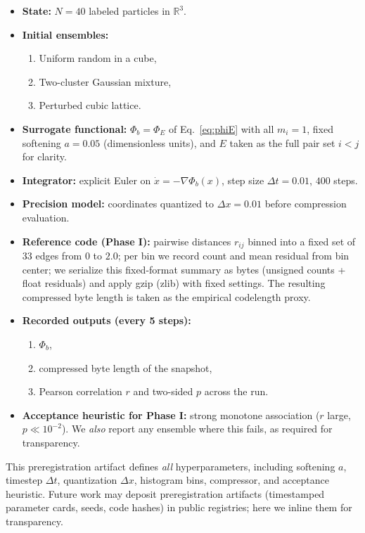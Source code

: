 \documentclass[11pt]{article}
\begin{document}
\begin{itemize}
    \item \textbf{State:} $N{=}40$ labeled particles in $\mathbb{R}^3$.
    \item \textbf{Initial ensembles:}
    \begin{enumerate}
        \item Uniform random in a cube,
        \item Two-cluster Gaussian mixture,
        \item Perturbed cubic lattice.
    \end{enumerate}
    \item \textbf{Surrogate functional:} $\Phi_b = \Phi_E$ of Eq.~\eqref{eq:phiE} with all $m_i{=}1$, fixed softening $a{=}0.05$ (dimensionless units), and $E$ taken as the full pair set $i{<}j$ for clarity.
    \item \textbf{Integrator:} explicit Euler on $\dot{x}=-\nabla\Phi_b(x)$, step size $\Delta t{=}0.01$, $400$ steps.
    \item \textbf{Precision model:} coordinates quantized to $\Delta x{=}0.01$ before compression evaluation.
    \item \textbf{Reference code (Phase I):} pairwise distances $r_{ij}$ binned into a fixed set of 33 edges from $0$ to $2.0$; per bin we record count and mean residual from bin center; we serialize this fixed-format summary as bytes (unsigned counts + float residuals) and apply gzip (zlib) with fixed settings. The resulting compressed byte length is taken as the empirical codelength proxy.
    \item \textbf{Recorded outputs (every 5 steps):}
    \begin{enumerate}
        \item $\Phi_b$,
        \item compressed byte length of the snapshot,
        \item Pearson correlation $r$ and two-sided $p$ across the run.
    \end{enumerate}
    \item \textbf{Acceptance heuristic for Phase I:} strong monotone association ($r$ large, $p\ll 10^{-2}$). We \emph{also} report any ensemble where this fails, as required for transparency.
\end{itemize}

This preregistration artifact defines \emph{all} hyperparameters, including softening $a$, timestep $\Delta t$, quantization $\Delta x$, histogram bins, compressor, and acceptance heuristic.
Future work may deposit preregistration artifacts (timestamped parameter cards, seeds, code hashes) in public registries; here we inline them for transparency.
\end{document}
